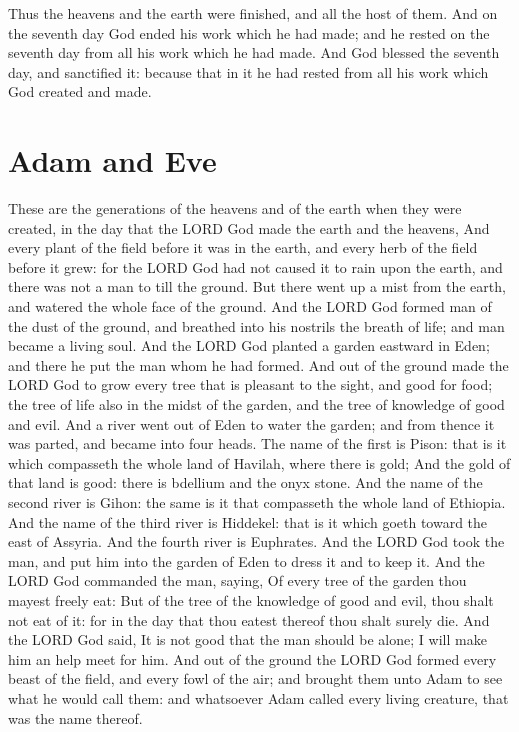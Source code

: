 \begin{biblechapter} %
\verse Thus the heavens and the earth were finished, and all the host of them.
\verse And on the seventh day God ended his work which he had made; and he rested on the seventh day from all his work which he had made.
\verse And God blessed the seventh day, and sanctified it: because that in it he had rested from all his work which God created and made.
\section*{Adam and Eve}
\verse These are the generations of the heavens and of the earth when they were created, in the day that the LORD God made the earth and the heavens,
\verse And every plant of the field before it was in the earth, and every herb of the field before it grew: for the LORD God had not caused it to rain upon the earth, and there was not a man to till the ground.
\verse But there went up a mist from the earth, and watered the whole face of the ground.
\verse And the LORD God formed man of the dust of the ground, and breathed into his nostrils the breath of life; and man became a living soul.
\verse And the LORD God planted a garden eastward in Eden; and there he put the man whom he had formed.
\verse And out of the ground made the LORD God to grow every tree that is pleasant to the sight, and good for food; the tree of life also in the midst of the garden, and the tree of knowledge of good and evil.
\verse And a river went out of Eden to water the garden; and from thence it was parted, and became into four heads.
\verse The name of the first is Pison: that is it which compasseth the whole land of Havilah, where there is gold;
\verse And the gold of that land is good: there is bdellium and the onyx stone.
\verse And the name of the second river is Gihon: the same is it that compasseth the whole land of Ethiopia.
\verse And the name of the third river is Hiddekel: that is it which goeth toward the east of Assyria. And the fourth river is Euphrates.
\verse And the LORD God took the man, and put him into the garden of Eden to dress it and to keep it.
\verse And the LORD God commanded the man, saying, Of every tree of the garden thou mayest freely eat:
\verse But of the tree of the knowledge of good and evil, thou shalt not eat of it: for in the day that thou eatest thereof thou shalt surely die.
\verse And the LORD God said, It is not good that the man should be alone; I will make him an help meet for him.
\verse And out of the ground the LORD God formed every beast of the field, and every fowl of the air; and brought them unto Adam to see what he would call them: and whatsoever Adam called every living creature, that was the name thereof.

\end{biblechapter}
